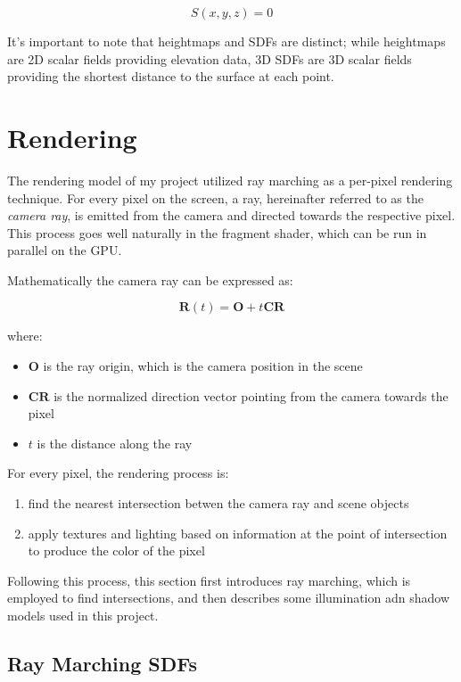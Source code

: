 \begin{equation}
S(x,y,z) = 0 
\end{equation}

It's important to note that heightmaps and SDFs are distinct; while heightmaps are 2D scalar fields providing elevation data, 3D SDFs are 3D scalar fields providing the shortest distance to the surface at each point. 


\section{Rendering}
\label{Rendering}

The rendering model of my project utilized ray marching as a per-pixel rendering technique. For every pixel on the screen, a ray, hereinafter referred to as the \textit{camera ray}, is emitted from the camera and directed towards the respective pixel. This process goes well naturally in the fragment shader, which can be run in parallel on the GPU.

Mathematically the camera ray can be expressed as:

\begin{equation}
 \mathbf{R}(t) = \mathbf{O} + t\mathbf{CR} 
\end{equation}

where:
\begin{itemize}
    \item $\mathbf{O}$ is the ray origin, which is the camera position in the scene
    \item $\mathbf{CR}$ is the normalized direction vector pointing from the camera towards the pixel
    \item $t$ is the distance along the ray
\end{itemize}

For every pixel, the rendering process is:
\begin{enumerate}
    \item find the nearest intersection betwen the camera ray and scene objects
    \item apply textures and lighting based on information at the point of intersection to produce the color of the pixel
\end{enumerate}

Following this process, this section first introduces ray marching, which is employed to find intersections, and then describes some illumination adn shadow models used in this project.

\subsection{Ray Marching SDFs}
\label{Raymarching SDFs}

